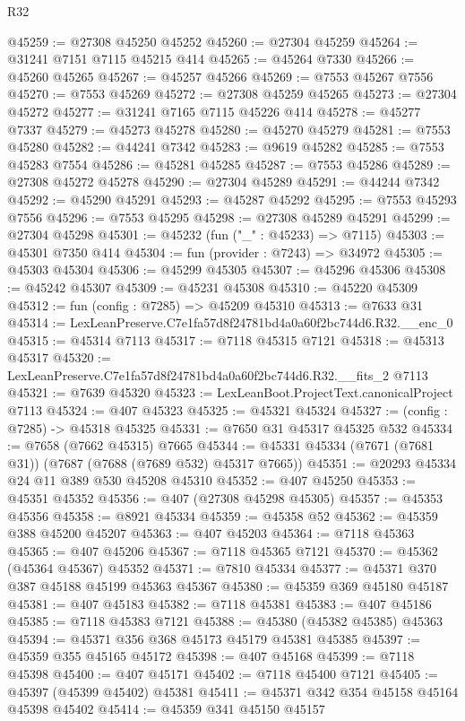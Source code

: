 \begin{lexlean}{R32}
\begin{coremodule}
@45259 := @27308 @45250 @45252
@45260 := @27304 @45259
@45264 := @31241 @7151 @7115 @45215 @414
@45265 := @45264 @7330
@45266 := @45260 @45265
@45267 := @45257 @45266
@45269 := @7553 @45267 @7556
@45270 := @7553 @45269
@45272 := @27308 @45259 @45265
@45273 := @27304 @45272
@45277 := @31241 @7165 @7115 @45226 @414
@45278 := @45277 @7337
@45279 := @45273 @45278
@45280 := @45270 @45279
@45281 := @7553 @45280
@45282 := @44241 @7342
@45283 := @9619 @45282
@45285 := @7553 @45283 @7554
@45286 := @45281 @45285
@45287 := @7553 @45286
@45289 := @27308 @45272 @45278
@45290 := @27304 @45289
@45291 := @44244 @7342
@45292 := @45290 @45291
@45293 := @45287 @45292
@45295 := @7553 @45293 @7556
@45296 := @7553 @45295
@45298 := @27308 @45289 @45291
@45299 := @27304 @45298
@45301 := @45232 (fun ("_" : @45233) => @7115)
@45303 := @45301 @7350 @414
@45304 := fun (provider : @7243) => @34972
@45305 := @45303 @45304
@45306 := @45299 @45305
@45307 := @45296 @45306
@45308 := @45242 @45307
@45309 := @45231 @45308
@45310 := @45220 @45309
@45312 := fun (config : @7285) => @45209 @45310
@45313 := @7633 @31
@45314 := LexLeanPreserve.C7e1fa57d8f24781bd4a0a60f2bc744d6.R32.__enc_0
@45315 := @45314 @7113
@45317 := @7118 @45315 @7121
@45318 := @45313 @45317
@45320 := LexLeanPreserve.C7e1fa57d8f24781bd4a0a60f2bc744d6.R32.__fits_2 @7113
@45321 := @7639 @45320
@45323 := LexLeanBoot.ProjectText.canonicalProject @7113
@45324 := @407 @45323
@45325 := @45321 @45324
@45327 := (config : @7285) -> @45318 @45325
@45331 := @7650 @31 @45317 @45325 @532
@45334 := @7658 (@7662 @45315) @7665
@45344 := @45331 @45334 (@7671 (@7681 @31)) (@7687 (@7688 (@7689 @532) @45317 @7665))
@45351 := @20293 @45334 @24 @11 @389 @530 @45208 @45310
@45352 := @407 @45250
@45353 := @45351 @45352
@45356 := @407 (@27308 @45298 @45305)
@45357 := @45353 @45356
@45358 := @8921 @45334
@45359 := @45358 @52
@45362 := @45359 @388 @45200 @45207
@45363 := @407 @45203
@45364 := @7118 @45363
@45365 := @407 @45206
@45367 := @7118 @45365 @7121
@45370 := @45362 (@45364 @45367) @45352
@45371 := @7810 @45334
@45377 := @45371 @370 @387 @45188 @45199 @45363 @45367
@45380 := @45359 @369 @45180 @45187
@45381 := @407 @45183
@45382 := @7118 @45381
@45383 := @407 @45186
@45385 := @7118 @45383 @7121
@45388 := @45380 (@45382 @45385) @45363
@45394 := @45371 @356 @368 @45173 @45179 @45381 @45385
@45397 := @45359 @355 @45165 @45172
@45398 := @407 @45168
@45399 := @7118 @45398
@45400 := @407 @45171
@45402 := @7118 @45400 @7121
@45405 := @45397 (@45399 @45402) @45381
@45411 := @45371 @342 @354 @45158 @45164 @45398 @45402
@45414 := @45359 @341 @45150 @45157

\end{coremodule}
\end{lexlean}
